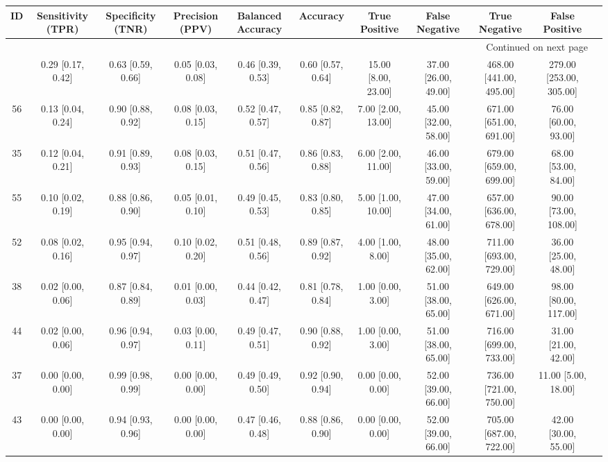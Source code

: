 \documentclass[8pt]{article}
\begin{document}
\begin{center}
\begin{footnotesize}
\begin{longtable}{|ccccccccccc|}
\toprule
 ID &  Sensitivity (TPR) &  Specificity (TNR) &    Precision (PPV) &  Balanced Accuracy &           Accuracy &        True Positive &        False Negative &            True Negative &           False Positive \\
\midrule
\endhead
\midrule
\multicolumn{10}{r}{{Continued on next page}} \\
\midrule
\endfoot

\bottomrule
\endlastfoot
 33 &  0.29 [0.17, 0.42] &  0.63 [0.59, 0.66] &  0.05 [0.03, 0.08] &  0.46 [0.39, 0.53] &  0.60 [0.57, 0.64] &  15.00 [8.00, 23.00] &  37.00 [26.00, 49.00] &  468.00 [441.00, 495.00] &  279.00 [253.00, 305.00] \\
 56 &  0.13 [0.04, 0.24] &  0.90 [0.88, 0.92] &  0.08 [0.03, 0.15] &  0.52 [0.47, 0.57] &  0.85 [0.82, 0.87] &   7.00 [2.00, 13.00] &  45.00 [32.00, 58.00] &  671.00 [651.00, 691.00] &     76.00 [60.00, 93.00] \\
 35 &  0.12 [0.04, 0.21] &  0.91 [0.89, 0.93] &  0.08 [0.03, 0.15] &  0.51 [0.47, 0.56] &  0.86 [0.83, 0.88] &   6.00 [2.00, 11.00] &  46.00 [33.00, 59.00] &  679.00 [659.00, 699.00] &     68.00 [53.00, 84.00] \\
 55 &  0.10 [0.02, 0.19] &  0.88 [0.86, 0.90] &  0.05 [0.01, 0.10] &  0.49 [0.45, 0.53] &  0.83 [0.80, 0.85] &   5.00 [1.00, 10.00] &  47.00 [34.00, 61.00] &  657.00 [636.00, 678.00] &    90.00 [73.00, 108.00] \\
 52 &  0.08 [0.02, 0.16] &  0.95 [0.94, 0.97] &  0.10 [0.02, 0.20] &  0.51 [0.48, 0.56] &  0.89 [0.87, 0.92] &    4.00 [1.00, 8.00] &  48.00 [35.00, 62.00] &  711.00 [693.00, 729.00] &     36.00 [25.00, 48.00] \\
 38 &  0.02 [0.00, 0.06] &  0.87 [0.84, 0.89] &  0.01 [0.00, 0.03] &  0.44 [0.42, 0.47] &  0.81 [0.78, 0.84] &    1.00 [0.00, 3.00] &  51.00 [38.00, 65.00] &  649.00 [626.00, 671.00] &    98.00 [80.00, 117.00] \\
 44 &  0.02 [0.00, 0.06] &  0.96 [0.94, 0.97] &  0.03 [0.00, 0.11] &  0.49 [0.47, 0.51] &  0.90 [0.88, 0.92] &    1.00 [0.00, 3.00] &  51.00 [38.00, 65.00] &  716.00 [699.00, 733.00] &     31.00 [21.00, 42.00] \\
 37 &  0.00 [0.00, 0.00] &  0.99 [0.98, 0.99] &  0.00 [0.00, 0.00] &  0.49 [0.49, 0.50] &  0.92 [0.90, 0.94] &    0.00 [0.00, 0.00] &  52.00 [39.00, 66.00] &  736.00 [721.00, 750.00] &      11.00 [5.00, 18.00] \\
 43 &  0.00 [0.00, 0.00] &  0.94 [0.93, 0.96] &  0.00 [0.00, 0.00] &  0.47 [0.46, 0.48] &  0.88 [0.86, 0.90] &    0.00 [0.00, 0.00] &  52.00 [39.00, 66.00] &  705.00 [687.00, 722.00] &     42.00 [30.00, 55.00] \\
\end{longtable}
\end{footnotesize}
\end{center}
\end{document}
